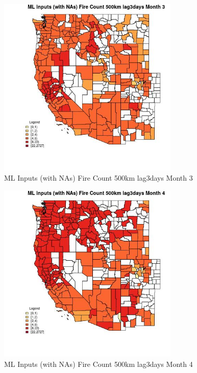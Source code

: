 \begin{figure} 
\centering  
\includegraphics[width=0.77\textwidth]{Code_Outputs/Report_ML_input_PM25_Step4_part_f_de_duplicated_aveswNAs_CountyFire_Count_500km_lag3daysmedianMonth3.jpg} 
\caption{\label{fig:Report_ML_input_PM25_Step4_part_f_de_duplicated_aveswNAsCountyFire_Count_500km_lag3daysmedianMonth3}ML Inputs (with NAs) Fire Count 500km lag3days Month 3} 
\end{figure} 
 

\begin{figure} 
\centering  
\includegraphics[width=0.77\textwidth]{Code_Outputs/Report_ML_input_PM25_Step4_part_f_de_duplicated_aveswNAs_CountyFire_Count_500km_lag3daysmedianMonth4.jpg} 
\caption{\label{fig:Report_ML_input_PM25_Step4_part_f_de_duplicated_aveswNAsCountyFire_Count_500km_lag3daysmedianMonth4}ML Inputs (with NAs) Fire Count 500km lag3days Month 4} 
\end{figure} 
 

